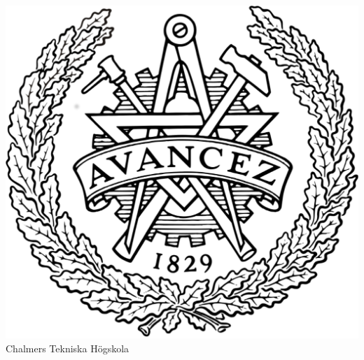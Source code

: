 \begin{titlingpage}
\vfill
\normalsize
\begin{minipage}{13em}
    \centering
    \includegraphics[scale=0.05]{figures/chalmer-logo.png}\\
    Chalmers Tekniska Högskola
\end{minipage}

\end{titlingpage}